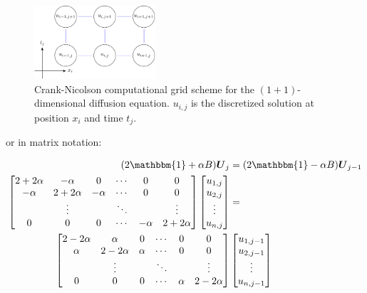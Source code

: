 \documentclass[a4paper, 11pt, notitlepage,english]{article}
\newcommand{\id}{\mathbbm{1}}
\begin{document}
\begin{figure}[h!tb]
 \centering
 \includegraphics[width=0.4\textwidth]{Grid_CN-figure0}
 \caption{Crank-Nicolson computational grid scheme for the $(1+1)$-dimensional diffusion equation. $u_{i,j}$ is the discretized solution at position $x_i$ and time $t_j$.}
 \label{fig:CN_grid}
\end{figure}


or in matrix notation:

\begin{align}
(2\id + \alpha B) \boldsymbol{U}_j &= (2\id - \alpha B) \boldsymbol{U}_{j-1} \\
\begin{bmatrix}
 2+2\alpha & -\alpha & 0 & \cdots & 0 & 0 \\
 -\alpha & 2+2\alpha & -\alpha & \cdots & 0 & 0 \\
  & \vdots & & \ddots & & \vdots \\
 0 & 0 & 0 & \cdots & -\alpha & 2+2\alpha \\
\end{bmatrix}
\begin{bmatrix}
u_{1,j} \\ u_{2,j} \\ \vdots \\ u_{n,j}
\end{bmatrix}
&= \\
\begin{bmatrix}
 2-2\alpha & \alpha & 0 & \cdots & 0 & 0 \\
 \alpha & 2-2\alpha & \alpha & \cdots & 0 & 0 \\
  & \vdots & & \ddots & & \vdots \\
 0 & 0 & 0 & \cdots & \alpha & 2-2\alpha \\
\end{bmatrix}
&\begin{bmatrix}
u_{1,j-1} \\ u_{2,j-1} \\ \vdots \\ u_{n,j-1}
\end{bmatrix}
\label{eq:Crank_Nicolson_matrix}
\end{align}
\end{document}
